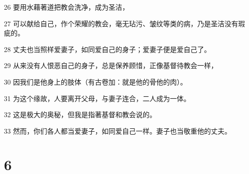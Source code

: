 \par 26 要用水藉著道把教会洗净，成为圣洁，
\par 27 可以献给自己，作个荣耀的教会，毫无玷污、皱纹等类的病，乃是圣洁没有瑕疵的。
\par 28 丈夫也当照样爱妻子，如同爱自己的身子；爱妻子便是爱自己了。
\par 29 从来没有人恨恶自己的身子，总是保养顾惜，正像基督待教会一样，
\par 30 因我们是他身上的肢体（有古卷加：就是他的骨他的肉）。
\par 31 为这个缘故，人要离开父母，与妻子连合，二人成为一体。
\par 32 这是极大的奥秘，但我是指著基督和教会说的。
\par 33 然而，你们各人都当爱妻子，如同爱自己一样。妻子也当敬重他的丈夫。

\chapter{6}

